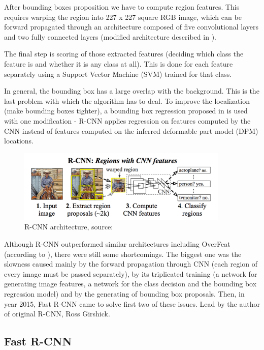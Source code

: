 \documentclass[journal, onecolumn, a4paper]{IEEEtran}
\begin{document}
After bounding boxes proposition we have to compute region features. This requires warping the region into 227 x 227 square RGB image, which can be forward propagated through an architecture composed of five convolutional layers and two fully connected layers (modified architecture described in \cite{cnn-class}). 

The final step is scoring of those extracted features (deciding which class the feature is and whether it is any class at all). This is done for each feature separately using a Support Vector Machine (SVM) trained for that class. 

In general, the bounding box has a large overlap with the background. This is the last problem with which the algorithm has to deal. To improve the localization (make bounding boxes tighter), a bounding box regression proposed in \cite{bbox-regression} is used with one modification - R-CNN applies regression on features computed by the CNN instead of features computed on the inferred deformable part model (DPM) locations. 

\begin{figure}[h] \centering
	\includegraphics[width=0.9\textwidth]{rcnn}
	\caption{R-CNN architecture, source: \cite{rcnn}}
\end{figure}

Although R-CNN outperformed similar architectures including OverFeat (according to \cite{rcnn}), there were still some shortcomings. The biggest one was the slowness caused mainly by the forward propagation through CNN (each region of every image must be passed separately), by its triplicated training (a network for generating image features, a network for the class decision and the bounding box regression model) and by the generating of bounding box proposals. Then, in year 2015, Fast R-CNN came to solve first two of these issues. Lead by the author of original R-CNN, Ross Girshick. 

\subsection{Fast R-CNN}
\end{document}
